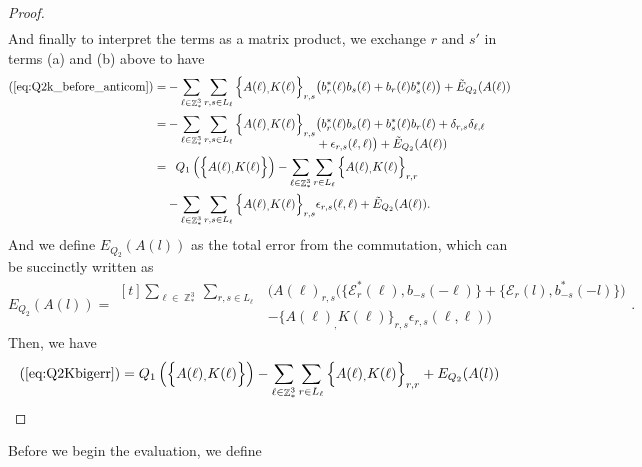 \documentclass[sn-mathphys,Numbered, a4paper ,nocrop]{sn-jnl}%
\DeclareMathOperator{\Z}{\mathbb{Z}}
\theoremstyle{plain}
\theoremstyle{definition}
\theoremstyle{remark}
\theoremstyle{plain}
\theoremstyle{definition}
\theoremstyle{remark}
\begin{document}
\begin{proof}
\begin{align}
\end{align}
And finally to interpret the terms as a matrix product, we exchange $r$ and $s'$ in terms (a) and (b) above to have 
\begin{alignat}{2}
    (\ref{eq:Q2k_before_anticom}) = &-\sum\limits_{\ell \in \Z^3_*}\sum\limits_{r,s \in L_{\ell}}\Big\{A(\ell)_
        ,K(\ell)\Big\}_{r,s}\big(b^*_{r}(\ell)b_{s}(\ell)+b_{r}(\ell)b^*_{s}(\ell) \big)\nonumber +\tilde E_{Q_2}(A(\ell))\\
        = &-\sum\limits_{\ell \in \Z^3_*}\sum\limits_{r,s \in L_{\ell}}\Big\{A(\ell)_
        ,K(\ell)\Big\}_{r,s}\begin{aligned}[t]
            &\big(b^*_{r}(\ell)b_{s}(\ell)+b^*_{s}(\ell)b_{r}(\ell) + \delta_{r,s}\delta_{\ell,\ell} \\&+ \epsilon_{r,s}(\ell,\ell) \big) +\tilde E_{Q_2}(A(\ell))
        \end{aligned}\\
        =&\phantom{-} Q_1\left(\Big\{A(\ell)_
        ,K(\ell)\Big\}\right)-\sum\limits_{\ell \in \Z^3_*}\sum\limits_{r \in L_{\ell}}\Big\{A(\ell)_
        ,K(\ell)\Big\}_{r,r}\nonumber\\
        &-\sum\limits_{\ell \in \Z^3_*}\sum\limits_{r,s \in L_{\ell}}\Big\{A(\ell)_,K(\ell)\Big\}_{r,s}\epsilon_{r,s}(\ell,\ell)  +\tilde E_{Q_2}(A(\ell)).\label{eq:Q2Kbigerr}
\end{alignat}
And we define $E_{Q_2}(A(l))$ as the total error from the commutation, which can be succinctly written as 
\begin{equation}
    E_{Q_2}(A(l)) =\begin{aligned}[t]
        \sum\limits_{\ell \in \Z^3_*}\sum\limits_{r,s \in L_{\ell}}&\Big(A(\ell)_{r,s}\big(\big\{\mathcal{E}^*_{r}(\ell), b_{-s}(-\ell)\big\} + \big\{\mathcal{E}_r(l), b^*_{-s}(-l)\big\}\big)\\&-\big\{A(\ell)_,K(\ell)\big\}_{r,s}\epsilon_{r,s}(\ell,\ell)\Big)
    \end{aligned} .  
\end{equation}
Then, we have 
\begin{equation}
    (\ref{eq:Q2Kbigerr}) = Q_1\left(\Big\{A(\ell)_
        ,K(\ell)\Big\}\right)-\sum\limits_{\ell \in \Z^3_*}\sum\limits_{r \in L_{\ell}}\Big\{A(\ell)_
        ,K(\ell)\Big\}_{r,r} + E_{Q_2}(A(l)) 
\end{equation}
\end{proof}

Before we begin the evaluation, we define
\end{document}

